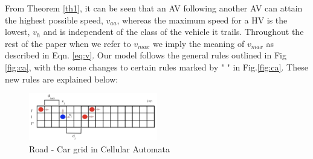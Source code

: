 \documentclass[oneside,letter,11pt]{article}
\begin{document}
From Theorem \ref{th1}, it can be seen that an AV following another AV can attain the highest possible speed, $v_{aa}$, whereas the maximum speed for a HV is the lowest, $v_{h}$ and is independent of the class of the vehicle it trails. Throughout the rest of the paper when we refer to $v_{max}$ we imply the meaning of $v_{max}$ as described in Eqn. \ref{eq:v}. Our model follows the general rules outlined in Fig \ref{fig:ca}, with the some changes to certain rules marked by "\textbf{\textasteriskcentered}
" in Fig.\ref{fig:ca}. These new rules are explained below: 
\begin{figure}[H]
\centering
  \includegraphics[width= 0.5\textwidth]{l2.png}
  \vspace{-0.3cm}
  \caption{Road - Car grid in Cellular Automata}
    \vspace{-0.2cm}
  \label{fig:lane}
\end{figure}
\end{document}
